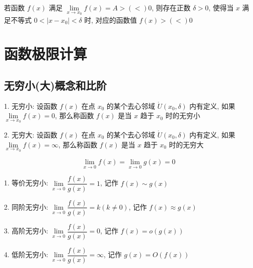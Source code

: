 \begin{property}[局部保号性]
	若函数 $f(x)$ 满足 $\lim\limits_{x\to x_{0}}f(x)=A>(<)0$, 则存在正数 $\delta>0$, 使得当 $x$ 满足不等式 $0<|x-x_{0}|<\delta$ 时, 对应的函数值 $f(x)>(<)0$
\end{property}

\section{函数极限计算}
\subsection{无穷小(大)概念和比阶}
\begin{definition}[无穷小(大)]
	1. 无穷小: 设函数 $f(x)$ 在点 $x_{0}$ 的某个去心邻域 $\mathring{U}(x_{0},\delta)$ 内有定义, 如果 $\lim\limits_{x\to x_{0}}f(x)=0$, 那么称函数 $f(x)$ 是当 $x$ 趋于 $x_{0}$ 时的无穷小

	2. 无穷大: 设函数 $f(x)$ 在点 $x_{0}$ 的某个去心邻域 $\mathring{U}(x_{0},\delta)$ 内有定义, 如果 $\lim\limits_{x\to x_{0}}f(x)=\infty$, 那么称函数 $f(x)$ 是当 $x$ 趋于 $x_{0}$ 时的无穷大
\end{definition}

\begin{definition}[无穷小比阶]
	$$\lim\limits_{x\to 0}f(x)=\lim\limits_{x\to 0}g(x)=0$$

	1. 等价无穷小: $\lim\limits_{x\to 0}\dfrac{f(x)}{g(x)}=1$, 记作 $f(x)\sim g(x)$

	2. 同阶无穷小: $\lim\limits_{x\to 0}\dfrac{f(x)}{g(x)}=k(k\neq 0)$, 记作 $f(x)\approx g(x)$

	3. 高阶无穷小: $\lim\limits_{x\to 0}\dfrac{f(x)}{g(x)}=0$, 记作 $f(x)=o(g(x))$

	4. 低阶无穷小: $\lim\limits_{x\to 0}\dfrac{f(x)}{g(x)}=\infty$, 记作 $g(x)=O(f(x))$
\end{definition}

